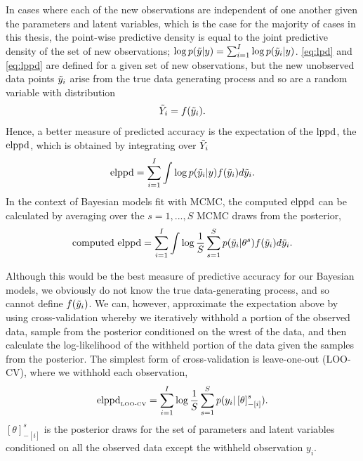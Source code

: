 In cases where each of the new observations are independent of one another given the parameters and latent variables, which is the case for the majority of cases in this thesis, the point-wise predictive density is equal to the joint predictive density of the set of new observations; $\log p(\Tilde{y}|y) = {\sum}^I_{i = 1} \log p(\Tilde{y}_i|y)$. \ref{eq:lpd} and \ref{eq:lppd} are defined for a given set of new observations, but the new unobserved data points $\Tilde{y}_i$ arise from the true data generating process and so are a random variable with distribution
\begin{equation} \label{ep:y_tild_dist}
 \Tilde{Y}_i = f(\Tilde{y}_i).
\end{equation}
Hence, a better measure of predicted accuracy is the expectation of the $\hbox{lppd}$, the $\hbox{elppd}$, which is obtained by integrating over $\Tilde{Y}_i$
\begin{equation} \label{ep:elppd}
 \hbox{elppd} = \sum^I_{i = 1} \int \log p(\Tilde{y}_i|y)f(\Tilde{y}_i) d\Tilde{y}_i.
\end{equation}
In the context of Bayesian models fit with MCMC, the computed $\hbox{elppd}$ can be calculated by averaging over the $s = 1, ..., S$ MCMC draws from the posterior,
\begin{equation} \label{ep:computed_elppd}
 \hbox{computed elppd} = \sum^I_{i = 1} \int \log \frac{1}{S} \sum^S_{s = 1} p(\Tilde{y}_i|\theta^s)f(\Tilde{y}_i) d\Tilde{y}_i.
\end{equation}

Although this would be the best measure of predictive accuracy for our Bayesian models, we obviously do not know the true data-generating process, and so cannot define $f(\Tilde{y}_i)$. We can, however, approximate the expectation above by using cross-validation whereby we iteratively withhold a portion of the observed data, sample from the posterior conditioned on the wrest of the data, and then calculate the log-likelihood of the withheld portion of the data given the samples from the posterior. The simplest form of cross-validation is leave-one-out (LOO-CV), where we withhold each observation,
\begin{equation} \label{eq:elppd_loo}
 \hbox{elppd}_{\text{\tiny{LOO-CV}}} = \sum^I_{i = 1} \log \frac{1}{S} \sum^S_{s = 1} p(y_i|\left[\theta\right]_{-\left[i\right]}^s).
\end{equation}
$\left[\theta\right]_{-\left[i\right]}^s$ is the posterior draws for the set of parameters and latent variables conditioned on all the observed data except the withheld observation $y_i$.

